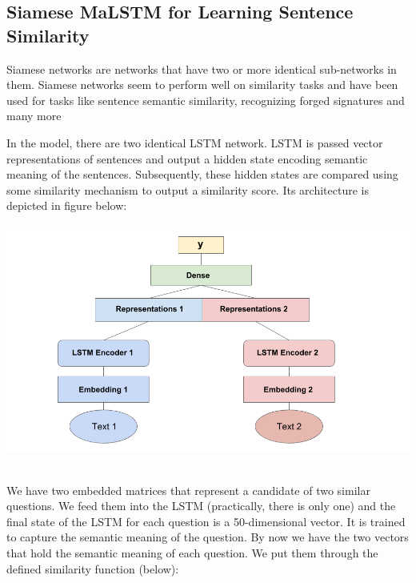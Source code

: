 \documentclass[runningheads]{llncs}
\begin{document}
	\subsection{Siamese MaLSTM for Learning Sentence Similarity}	
	Siamese networks are networks that have two or more identical sub-networks in them.
	Siamese networks seem to perform well on similarity tasks and have been used for tasks like sentence semantic similarity, recognizing forged signatures and many more
	
	In the model, there are two identical LSTM network. LSTM is passed vector representations of sentences and output a hidden state encoding semantic meaning of the sentences. Subsequently, these hidden states are compared using some similarity mechanism to output a similarity score.
	Its architecture is depicted in figure below:
	
	\begin{minipage}{\linewidth}
		\begin{center}
			\includegraphics[width=\linewidth]{siamese_image.png}
			\label{fig:Siamese LSTM Architectture}~\cite{ref_url22}
		\end{center}
	\end{minipage}
	\afterpage{\clearpage}
	
	
	We have two embedded matrices that represent a candidate of two similar questions.  We feed them into the LSTM (practically, there is only one) and the final state of the LSTM for each question is a 50-dimensional vector. It is trained to capture the semantic meaning of the question. By now we have the two vectors that hold the semantic meaning of each question. We put them through the defined similarity function (below):
	
\end{document}
